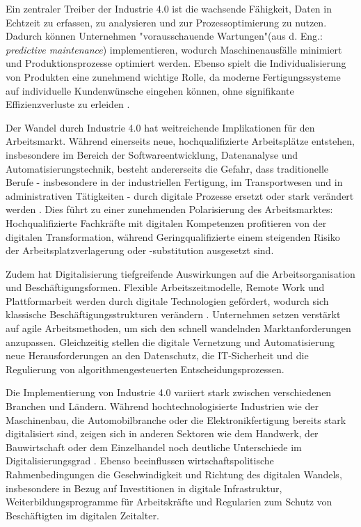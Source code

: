 Ein zentraler Treiber der Industrie 4.0 ist die wachsende Fähigkeit, Daten in Echtzeit zu 
erfassen, zu analysieren und zur Prozessoptimierung zu nutzen. Dadurch können Unternehmen 
"vorausschauende Wartungen"(aus d. Eng.: \textit{predictive maintenance}) implementieren, 
wodurch Maschinenausfälle minimiert und Produktionsprozesse optimiert werden. Ebenso 
spielt die Individualisierung von Produkten eine zunehmend wichtige Rolle, da moderne 
Fertigungssysteme auf individuelle Kundenwünsche eingehen können, ohne signifikante 
Effizienzverluste zu erleiden \parencite[S. 85]{bartodziej2016theconcept}.

Der Wandel durch Industrie 4.0 hat weitreichende Implikationen für den Arbeitsmarkt. 
Während einerseits neue, hochqualifizierte Arbeitsplätze entstehen, insbesondere im Bereich 
der Softwareentwicklung, Datenanalyse und Automatisierungstechnik, besteht andererseits 
die Gefahr, dass traditionelle Berufe - insbesondere in der industriellen Fertigung, im 
Transportwesen und in administrativen Tätigkeiten - durch digitale Prozesse ersetzt oder 
stark verändert werden \parencite[S. 40]{frey2016thefuture}. Dies führt zu einer 
zunehmenden Polarisierung des Arbeitsmarktes: Hochqualifizierte Fachkräfte mit digitalen 
Kompetenzen profitieren von der digitalen Transformation, während Geringqualifizierte 
einem steigenden Risiko der Arbeitsplatzverlagerung oder -substitution ausgesetzt sind.

Zudem hat Digitalisierung tiefgreifende Auswirkungen auf die Arbeitsorganisation und 
Beschäftigungsformen. Flexible Arbeitszeitmodelle, Remote Work und Plattformarbeit werden 
durch digitale Technologien gefördert, wodurch sich klassische Beschäftigungsstrukturen 
verändern \parencite[S. 112]{schwab2016thefourth}. Unternehmen setzen verstärkt auf agile 
Arbeitsmethoden, um sich den schnell wandelnden Marktanforderungen anzupassen. 
Gleichzeitig stellen die digitale Vernetzung und Automatisierung neue Herausforderungen 
an den Datenschutz, die IT-Sicherheit und die Regulierung von algorithmengesteuerten 
Entscheidungsprozessen.

Die Implementierung von Industrie 4.0 variiert stark zwischen verschiedenen Branchen und 
Ländern. Während hochtechnologisierte Industrien wie der Maschinenbau, die 
Automobilbranche oder die Elektronikfertigung bereits stark digitalisiert sind, zeigen 
sich in anderen Sektoren wie dem Handwerk, der Bauwirtschaft oder dem Einzelhandel noch 
deutliche Unterschiede im Digitalisierungsgrad 
\parencite[S. 77]{brennen2016theinternational}. Ebenso beeinflussen wirtschaftspolitische 
Rahmenbedingungen die Geschwindigkeit und Richtung des digitalen Wandels, insbesondere in 
Bezug auf Investitionen in digitale Infrastruktur, Weiterbildungsprogramme für 
Arbeitskräfte und Regularien zum Schutz von Beschäftigten im digitalen Zeitalter.

